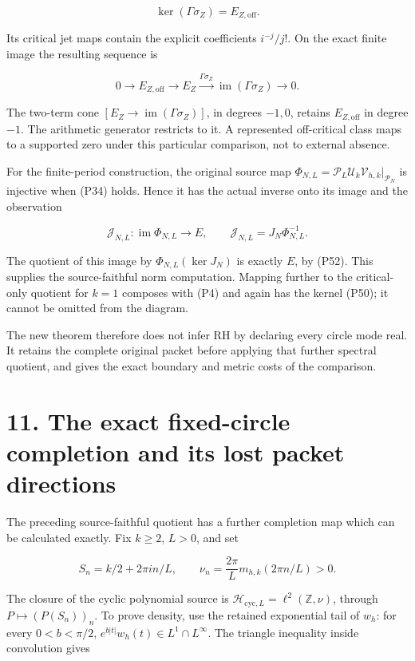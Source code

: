 \documentclass[
]{article}
\begin{document}
\[
\ker(\Gamma\sigma_Z)=E_{Z,\mathrm{off}}.
\tag{P50}
\]

Its critical jet maps contain the explicit coefficients \(i^{-j}/j!\).
On the exact finite image the resulting sequence is

\[
0\to E_{Z,\mathrm{off}}\to E_Z
\xrightarrow{\Gamma\sigma_Z}\operatorname{im}(\Gamma\sigma_Z)\to0.
\tag{P51}
\]

The two-term cone \([E_Z\to\operatorname{im}(\Gamma\sigma_Z)]\), in
degrees \(-1,0\), retains \(E_{Z,\mathrm{off}}\) in degree \(-1\). The
arithmetic generator restricts to it. A represented off-critical class
maps to a supported zero under this particular comparison, not to
external absence.

For the finite-period construction, the original source map
\(\Phi_{N,L}=\mathcal P_L\mathcal U_k\mathcal V_{h,k}|_{\mathcal P_N}\)
is injective when (P34) holds. Hence it has the actual inverse onto its
image and the observation

\[
\mathcal J_{N,L}:\operatorname{im}\Phi_{N,L}\to E,
\qquad \mathcal J_{N,L}=J_N\Phi_{N,L}^{-1}.
\tag{P52}
\]

The quotient of this image by \(\Phi_{N,L}(\ker J_N)\) is exactly \(E\),
by (P52). This supplies the source-faithful norm computation. Mapping
further to the critical-only quotient for \(k=1\) composes with (P4) and
again has the kernel (P50); it cannot be omitted from the diagram.

The new theorem therefore does not infer RH by declaring every circle
mode real. It retains the complete original packet before applying that
further spectral quotient, and gives the exact boundary and metric costs
of the comparison.

\section{11. The exact fixed-circle completion and its lost packet
directions}\label{the-exact-fixed-circle-completion-and-its-lost-packet-directions}

The preceding source-faithful quotient has a further completion map
which can be calculated exactly. Fix \(k\ge2\), \(L>0\), and set

\[
S_n=k/2+2\pi i n/L,\qquad
\nu_n=\frac{2\pi}{L}m_{h,k}(2\pi n/L)>0.
\tag{P53}
\]

The closure of the cyclic polynomial source is
\(\mathcal H_{\mathrm{cyc},L}=\ell^2(\mathbb Z,\nu)\), through
\(P\mapsto(P(S_n))_n\). To prove density, use the retained exponential
tail of \(w_h\): for every \(0<b<\pi/2\),
\(e^{b|t|}w_h(t)\in L^1\cap L^\infty\). The triangle inequality inside
convolution gives
\end{document}

